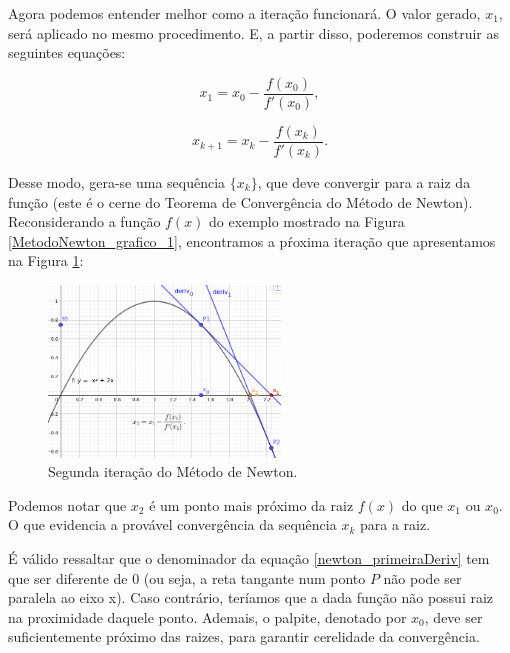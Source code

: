 Agora podemos entender melhor como a iteração funcionará. O valor
gerado, $x_1$, será aplicado no mesmo procedimento. E, a partir disso,
poderemos construir as seguintes equações:

\begin{equation}
    x_{1} = x_{0} - \frac {f(x_{0})}{f'(x_{0})},
\end{equation}

\begin{equation}
    x_{k+1} = x_{k} - \frac {f(x_{k})}{f'(x_{k})}.
    \label{newton_primeiraDeriv}
\end{equation}


Desse modo, gera-se uma sequência $\{x_k\}$, que deve convergir para a
raiz da função (este é o cerne do Teorema de Convergência do Método de Newton).
Reconsiderando a função $f(x)$ do exemplo mostrado na Figura
\ref{MetodoNewton_grafico_1}, encontramos a pŕoxima iteração que apresentamos
na Figura \ref{MetodoNewton_grafico_2}:

\begin{figure}[h]
    \centering
    \includegraphics[width=0.55\textwidth]
      {src/MetodoNewton_grafico_2.png}
    \caption{
      Segunda iteração do Método de Newton.
    }
    \label{MetodoNewton_grafico_2}
\end{figure}

\newpage
Podemos notar que $x_2$ é um ponto mais próximo da raiz $f(x)$ do que $x_1$
ou $x_0$. O que evidencia a provável convergência da sequência $x_k$ para a
raiz.

É válido ressaltar que o denominador da equação
\ref{newton_primeiraDeriv} tem que ser diferente de 0 (ou seja, a reta tangante
num ponto $P$ não pode ser paralela ao eixo x). Caso contrário, teríamos
que a dada função não possui raiz na proximidade daquele ponto. Ademais, o
palpite, denotado por $x_0$, deve ser suficientemente próximo das raizes, para
garantir cerelidade da convergência.

